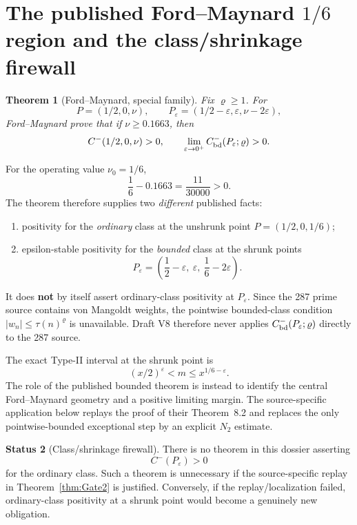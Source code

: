 \documentclass[11pt]{article}
\newtheorem{theorem}{Theorem}[section]
\theoremstyle{definition}
\newtheorem{status}[theorem]{Status}
\theoremstyle{remark}
\newcommand{\1}{\mathbf 1}
\begin{document}
\section{The published Ford--Maynard $1/6$ region and the class/shrinkage firewall}

\begin{theorem}[Ford--Maynard, special family]\label{thm:FM27}
Fix $\varrho\ge1$.  For
\[
 P=(1/2,0,\nu),\qquad P_\varepsilon=(1/2-\varepsilon,\varepsilon,\nu-2\varepsilon),
\]
Ford--Maynard prove that if $\nu\ge0.1663$, then
\[
 C^-(1/2,0,\nu)>0,
 \qquad
 \lim_{\varepsilon\to0^+}C^-_{\rm bd}(P_\varepsilon;\varrho)>0.
\]
\end{theorem}

For the operating value $\nu_0=1/6$,
\[
 \frac16-0.1663=\frac{11}{30000}>0.
\]
The theorem therefore supplies two \emph{different} published facts:
\begin{enumerate}[label=(\roman*)]
\item positivity for the \emph{ordinary} class at the unshrunk point $P=(1/2,0,1/6)$;
\item epsilon-stable positivity for the \emph{bounded} class at the shrunk points
\[
 P_\varepsilon=\left(\frac12-\varepsilon,\ \varepsilon,\ \frac16-2\varepsilon\right).
\]
\end{enumerate}
It does \textbf{not} by itself assert ordinary-class positivity at $P_\varepsilon$.  Since the 287 prime source
contains von Mangoldt weights, the pointwise bounded-class condition $|w_n|\le\tau(n)^\varrho$ is unavailable.
Draft V8 therefore never applies $C^-_{\rm bd}(P_\varepsilon;\varrho)$ directly to the 287 source.

The exact Type-II interval at the shrunk point is
\[
 \boxed{(x/2)^\varepsilon<m\le x^{1/6-\varepsilon}.}
\tag{FM-window}
\]
The role of the published bounded theorem is instead to identify the central Ford--Maynard geometry and a
positive limiting margin.  The source-specific application below replays the proof of their Theorem~8.2 and
replaces the only pointwise-bounded exceptional step by an explicit $N_2$ estimate.

\begin{status}[Class/shrinkage firewall]
There is no theorem in this dossier asserting
\[
 C^-(P_\varepsilon)>0
\]
for the ordinary class.  Such a theorem is unnecessary if the source-specific replay in
Theorem~\ref{thm:Gate2} is justified.  Conversely, if the replay/localization failed, ordinary-class positivity
at a shrunk point would become a genuinely new obligation.
\end{status}
\end{document}
